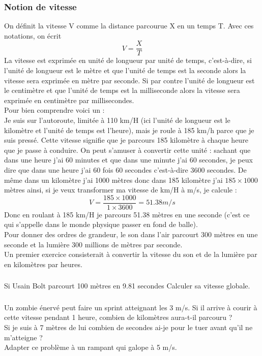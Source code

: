 \documentclass[a4paper,10pt]{article}
\newcommand\black{\color{black}}
\newcommand\npurple{\color{dmag}}
\newcommand{\subsub}{\subsubsection}
\begin{document}
\subsubsection*{Notion de vitesse}
On définit la vitesse V comme la distance parcourue X en un temps T. Avec ces notations, on écrit
\begin{equation*}
V = \frac{X}{T}
\end{equation*}
La vitesse est exprimée en unité de longueur par unité de temps, c'est-à-dire, si l'unité de longueur est le mètre et que l'unité de temps est la seconde alors la vitesse sera exprimée en mètre par seconde. Si par contre l'unité de longueur est le centimètre et que l'unité de temps est la milliseconde alors la vitesse sera exprimée en centimètre par millisecondes.\\
Pour bien comprendre voici un \npurple{\textbf{exemple}} \black :\\
Je suis sur l'autoroute, limitée à 110 km/H (ici l'unité de longueur est le kilomètre et l'unité de temps est l'heure), mais je roule à 185 km/h parce que je suis pressé. Cette vitesse signifie que je parcours 185 kilomètre à chaque heure que je passe à conduire. On peut s'amuser à convertir cette unité : sachant que dans une heure j'ai 60 minutes et que dans une minute j'ai 60 secondes, je peux dire que dans une heure j'ai 60 fois 60 secondes c'est-à-dire 3600 secondes. De même dans un kilomètre j'ai 1000 mètres donc dans 185 kilomètre j'ai $185 \times 1000$ mètres ainsi, si je veux transformer ma vitesse de km/H à m/s, je calcule :
\begin{equation*}
V = \frac{185 \times 1000}{1 \times 3600} = 51.38 m/s
\end{equation*}
Donc en roulant à 185 km/H je parcours 51.38 mètres en une seconde (c'est ce qui s'appelle dans le monde physique passer en fond de balle).\\
Pour donner des ordres de grandeur, le son dans l'air parcourt 300 mètres en une seconde et la lumière 300 millions de mètres par seconde.\\
Un premier exercice consisterait à convertir la vitesse du son et de la lumière par en kilomètres par heures. \\

\subsub{}
Si Usain Bolt parcourt 100 mètres en 9.81 secondes Calculer sa vitesse globale.\\
\subsub{}
Un zombie énervé peut faire un sprint atteignant les 3 m/s. Si il arrive à courir à cette vitesse pendant 1 heure, combien de kilomètres aura-t-il parcouru ?\\
Si je suis à 7 mètres de lui combien de secondes ai-je pour le tuer avant qu'il ne m'atteigne ? \\
Adapter ce problème à un rampant qui galope à 5 m/s.
\end{document}
